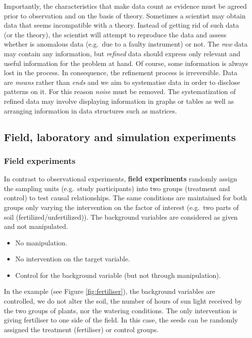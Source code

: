 \documentclass[
]{book}
\providecommand{\tightlist}{%
  \setlength{\itemsep}{0pt}\setlength{\parskip}{0pt}}
\begin{document}
Importantly, the characteristics that make data count as evidence must be agreed prior to observation and on the basis of theory. Sometimes a scientist may obtain data that seems incompatible with a theory. Instead of getting rid of such data (or the theory), the scientist will attempt to reproduce the data and assess whether is anomalous data (e.g.~due to a faulty instrument) or not. The \emph{raw} data may contain any information, but \emph{refined} data should express only relevant and useful information for the problem at hand. Of course, some information is always lost in the process. In consequence, the refinement process is irreversible. Data are \emph{means} rather than \emph{ends} and we aim to systematise data in order to disclose patterns on it. For this reason \emph{noise} must be removed. The systematization of refined data may involve displaying information in graphs or tables as well as arranging information in data structures such as matrices.

\hypertarget{field-laboratory-and-simulation-experiments}{%
\subsection{Field, laboratory and simulation experiments}\label{field-laboratory-and-simulation-experiments}}

\hypertarget{field-experiments}{%
\subsubsection{Field experiments}\label{field-experiments}}

In contrast to observational experiments, \textbf{field experiments} randomly assign the sampling units (e.g.~study participants) into two groups (treatment and control) to test causal relationships. The same conditions are maintained for both groups only varying the intervention on the factor of interest (e.g.~two parts of soil (fertilized/unfertilized)). The background variables are considered as given and not manipulated.

\begin{itemize}
\tightlist
\item
  No manipulation.
\item
  No intervention on the target variable.
\item
  Control for the background variable (but not through manipulation).
\end{itemize}

In the example (see Figure \ref{fig:fertiliser}), the background variables are controlled, we do not alter the soil, the number of hours of sun light received by the two groups of plants, nor the watering conditions. The only intervention is giving fertiliser to one side of the field. In this case, the seeds can be randomly assigned the treatment (fertiliser) or control groups.
\end{document}
